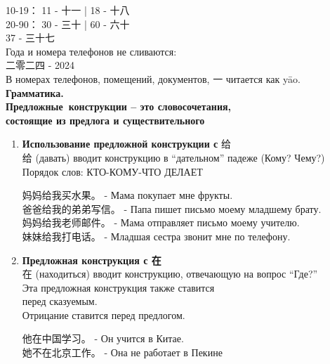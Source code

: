 10-19： 11 - 十一 | 18 - 十八\\
20-90： 30 - 三十 | 60 - 六十\\
37 - 三十七\\
Года и номера телефонов не сливаются:\\
二零二四 - 2024\\
В номерах телефонов, помещений, документов, 一 читается как yāo.\\
\newpage
\textbf{Грамматика.}\\
\textbf{Предложные\ конструкции – это словосочетания,\\
состоящие из предлога и существительного}
\begin{enumerate}
	\item \textbf{Использование предложной конструкции с} 给\\
	给 (давать) вводит конструкцию в “дательном” падеже (Кому? Чему?)\\
	Порядок слов: КТО-КОМУ-ЧТО ДЕЛАЕТ
	\begin{example}\hfill\break
		妈妈给我买水果。 - Мама покупает мне фрукты.\\
		爸爸给我的弟弟写信。 - Папа пишет письмо моему младшему брату.\\
		妈妈给我老师邮件。 - Мама отправляет письмо моему учителю.\\
		妹妹给我打电话。 - Младшая сестра звонит мне по телефону.
	\end{example}
	\item \textbf{Предложная конструкция с 在}\\
	在 (находиться) вводит конструкцию, отвечающую на вопрос “Где?”\\
	Эта предложная конструкция также ставится\\
	перед сказуемым.\\
	Отрицание ставится перед предлогом.
	\begin{example}\hfill\break
		他在中国学习。 - Он учится в Китае.\\
		她不在北京工作。 - Она не работает в Пекине
	\end{example}
\end{enumerate}